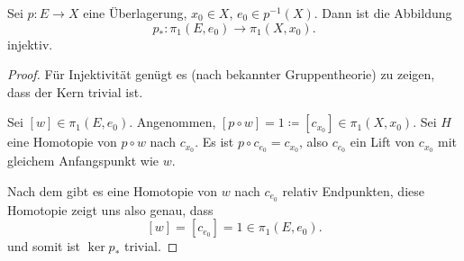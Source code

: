 \begin{theorem}\label{thm:morphismus-von-fundamentalgruppen-bei-überlagerung-ist-trivial}
    Sei $p\colon  E \to  X$ eine Überlagerung, $x_0\in X$, $e_0\in p^{-1} (X)$. Dann ist die Abbildung
    \[
        p_*\colon  \pi_1(E,e_0) \to  \pi_1(X,x_0)
    .\] 
    injektiv.
\end{theorem}

\begin{proof}
    Für Injektivität genügt es (nach bekannter Gruppentheorie) zu zeigen, dass der Kern trivial ist.

Sei $[w]\in \pi_1(E,e_0)$. Angenommen, $[p \circ  w] = 1 \coloneqq [c_{x_0}]\in \pi_1(X,x_0)$. Sei $H$ eine Homotopie von  $p \circ  w$ nach $c_{x_0}$. Es ist $p \circ  c_{e_0} = c_{x_0}$, also $c_{e_0}$ ein Lift von $c_{x_0}$ mit gleichem Anfangspunkt wie $w$.

Nach dem  gibt es eine Homotopie von $w$ nach  $c_{e_0}$ relativ Endpunkten, diese Homotopie zeigt uns also genau, dass
\[
    [w] = [c_{e_0}]  = 1 \in \pi_1(E,e_0)
.\] 
und somit ist $\ker p_*$ trivial.
\end{proof}

